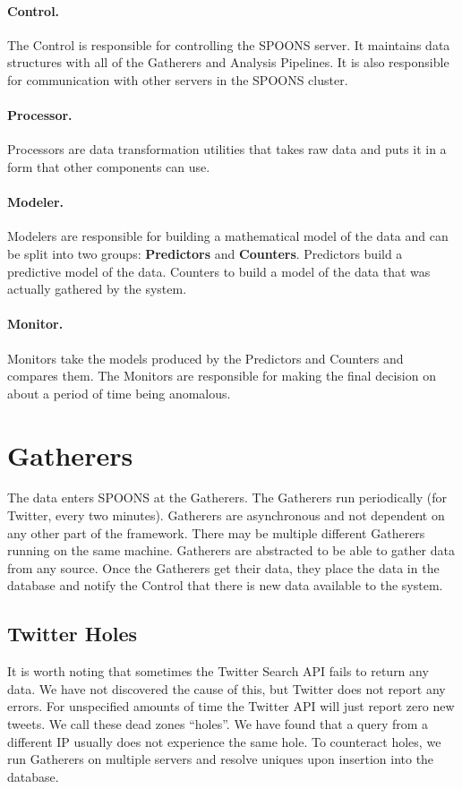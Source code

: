 \documentclass[12pt]{ucthesis}
\begin{document}
\paragraph{Control.}
The Control is responsible for controlling the SPOONS server. It maintains data structures with all of the Gatherers and
Analysis Pipelines. It is also responsible for communication with other servers in the SPOONS cluster.

\paragraph{Processor.}
Processors are data transformation utilities that takes raw data and puts it in a form that other components can use.

\paragraph{Modeler.}
Modelers are responsible for building a mathematical model of the data and can be split into two groups: \textbf{Predictors} and \textbf{Counters}.
Predictors build a predictive model of the data. Counters to build a model of the data that was actually gathered by the system.

\paragraph{Monitor.}
Monitors take the models produced by the Predictors and Counters and compares them. The Monitors are responsible for
making the final decision on about a period of time being anomalous.

\section{Gatherers}
\label{arch-gatherers}
The data enters SPOONS at the Gatherers. The Gatherers run periodically (for Twitter, every two minutes).
Gatherers are asynchronous and not dependent on any other part of the framework. There may be multiple different
Gatherers running on the same machine. Gatherers are abstracted to be able to gather data from any source.
Once the Gatherers get their data, they place the data in the database and notify the Control that there is new data
available to the system.

\subsection{Twitter Holes}
\label{arch-twitter-holes}
It is worth noting that sometimes the Twitter Search API fails to return any data. We have not discovered the cause
of this, but Twitter does not report any errors. For unspecified amounts of time the Twitter API will just report zero
new tweets. We call these dead zones ``holes''. We have found that a query from a different IP usually does not
experience the same hole. To counteract holes, we run Gatherers on multiple servers and resolve uniques upon insertion
into the database.
\end{document}

